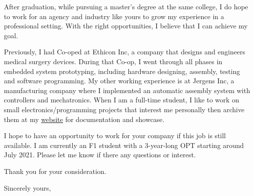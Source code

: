 \documentclass[11pt]{letter} %
\begin{document}
\begin{letter}
After graduation, while pursuing a master’s degree at the same college, I do hope to work for an agency and industry like yours to grow my experience in a professional setting. With the right opportunities, I believe that I can achieve my goal.

Previously, I had Co-oped at Ethicon Inc, a company that designs and engineers medical surgery devices. During that Co-op, I went through all phases in embedded system prototyping, including hardware designing, assembly, testing and software programming. My other working experience is at Jergens Inc, a manufacturing company where I implemented an automatic assembly system with controllers and mechatronics. When I am a full-time student, I like to work on small electronics/programming projects that interest me personally then archive them at my \href{https://liu2z2.github.io/tags#project-ref}{website} for documentation and showcase. 

I hope to have an opportunity to work for your company if this job is still available. I am currently an F1 student with a 3-year-long OPT starting around July 2021. Please let me know if there any questions or interest. 

Thank you for your consideration.

\closing{Sincerely yours,}




\end{letter}
\end{document}
